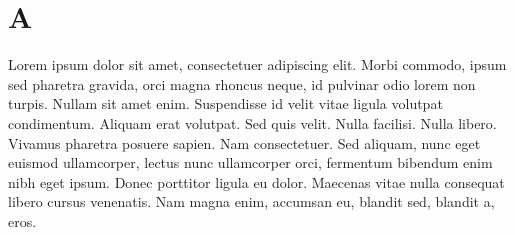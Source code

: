 \chapter{A}\label{AppendixA}

Lorem ipsum dolor sit amet, consectetuer adipiscing elit. Morbi commodo, ipsum sed
pharetra gravida, orci magna rhoncus neque, id pulvinar odio lorem non turpis. Nullam sit
amet enim. Suspendisse id velit vitae ligula volutpat condimentum. Aliquam erat volutpat.
Sed quis velit. Nulla facilisi. Nulla libero. Vivamus pharetra posuere sapien. Nam
consectetuer. Sed aliquam, nunc eget euismod ullamcorper, lectus nunc ullamcorper orci,
fermentum bibendum enim nibh eget ipsum. Donec porttitor ligula eu dolor. Maecenas vitae
nulla consequat libero cursus venenatis. Nam magna enim, accumsan eu, blandit sed,
blandit a, eros.
